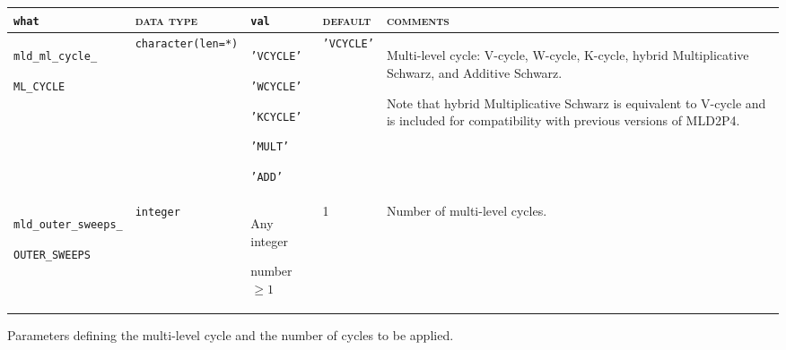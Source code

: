 \bsideways
\begin{center}
\begin{tabular}{|p{3.6cm}|l|p{2.4cm}|p{2.4cm}|p{7.2cm}|}
\hline
\verb|what|              & \textsc{data type}        &  \verb|val|      &  \textsc{default}  &
\textsc{comments} \\ \hline
\verb|mld_ml_cycle_| \par \verb|ML_CYCLE|     & \verb|character(len=*)|
                         & \texttt{'VCYCLE'} \par \texttt{'WCYCLE'}   \par \texttt{'KCYCLE'} \par
                             \texttt{'MULT'} \par \texttt{'ADD'}
                         & \texttt{'VCYCLE'}
                         &Multi-level cycle: V-cycle, W-cycle, K-cycle, hybrid Multiplicative Schwarz,
                           and Additive Schwarz. \par
                           Note that hybrid Multiplicative Schwarz is equivalent to V-cycle and
                           is included for compatibility with previous versions of MLD2P4. \\ \hline
\verb|mld_outer_sweeps_| \par  \verb|OUTER_SWEEPS| & \texttt{integer} &
                           Any integer \par number $\ge 1$  & 1 &
                           Number of multi-level cycles. \\ \hline
\end{tabular}
\end{center}
\caption{Parameters defining the multi-level cycle and the number of cycles to
be applied.
\label{tab:p_cycle}}                       
\esideways
                   
